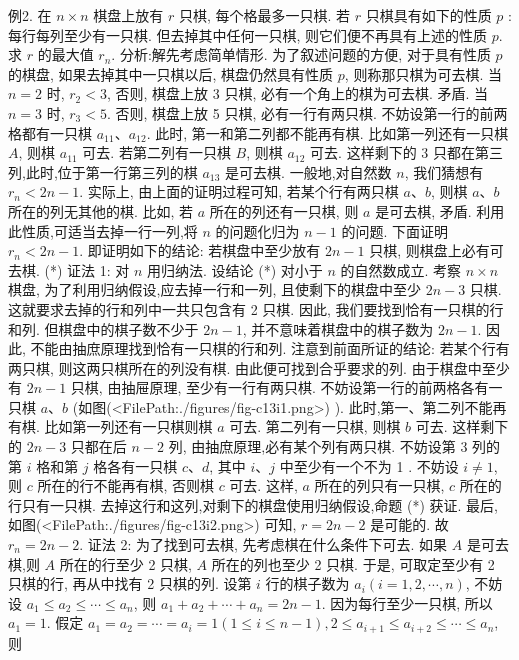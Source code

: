 例2. 在 $n \times n$ 棋盘上放有 $r$ 只棋, 每个格最多一只棋.
若 $r$ 只棋具有如下的性质 $p$ : 每行每列至少有一只棋.
但去掉其中任何一只棋, 则它们便不再具有上述的性质 $p$. 求 $r$ 的最大值 $r_n$.
分析:解先考虑简单情形.
为了叙述问题的方便, 对于具有性质 $p$ 的棋盘, 如果去掉其中一只棋以后, 棋盘仍然具有性质 $p$, 则称那只棋为可去棋.
当 $n=2$ 时, $r_2<3$, 否则, 棋盘上放 3 只棋, 必有一个角上的棋为可去棋.
矛盾.
当 $n=3$ 时, $r_3<5$. 否则, 棋盘上放 5 只棋, 必有一行有两只棋.
不妨设第一行的前两格都有一只棋 $a_{11} 、 a_{12}$. 此时, 第一和第二列都不能再有棋.
比如第一列还有一只棋 $A$, 则棋 $a_{11}$ 可去.
若第二列有一只棋 $B$, 则棋 $a_{12}$ 可去.
这样剩下的 3 只都在第三列,此时,位于第一行第三列的棋 $a_{13}$ 是可去棋.
一般地,对自然数 $n$, 我们猜想有 $r_n<2 n-1$.
实际上, 由上面的证明过程可知, 若某个行有两只棋 $a 、 b$, 则棋 $a 、 b$ 所在的列无其他的棋.
比如, 若 $a$ 所在的列还有一只棋, 则 $a$ 是可去棋, 矛盾.
利用此性质,可适当去掉一行一列,将 $n$ 的问题化归为 $n-1$ 的问题.
下面证明 $r_n<2 n-1$. 即证明如下的结论:
若棋盘中至少放有 $2 n-1$ 只棋, 则棋盘上必有可去棋. (*)
证法 1: 对 $n$ 用归纳法.
设结论 (*) 对小于 $n$ 的自然数成立.
考察 $n \times n$ 棋盘, 为了利用归纳假设,应去掉一行和一列, 且使剩下的棋盘中至少 $2 n-3$ 只棋.
这就要求去掉的行和列中一共只包含有 2 只棋.
因此, 我们要找到恰有一只棋的行和列.
但棋盘中的棋子数不少于 $2 n-1$, 并不意味着棋盘中的棋子数为 $2 n-1$. 因此, 不能由抽庶原理找到恰有一只棋的行和列.
注意到前面所证的结论: 若某个行有两只棋, 则这两只棋所在的列没有棋.
由此便可找到合乎要求的列.
由于棋盘中至少有 $2 n-1$ 只棋, 由抽屉原理, 至少有一行有两只棋.
不妨设第一行的前两格各有一只棋 $a 、 b$ (如图(<FilePath:./figures/fig-c13i1.png>) ). 此时,第一、第二列不能再有棋.
比如第一列还有一只棋则棋 $a$ 可去.
第二列有一只棋, 则棋 $b$ 可去.
这样剩下的 $2 n-3$ 只都在后 $n-2$ 列, 由抽庶原理,必有某个列有两只棋.
不妨设第 3 列的第 $i$ 格和第 $j$ 格各有一只棋 $c 、 d$, 其中 $i 、 j$ 中至少有一个不为 1 . 不妨设 $i \neq 1$, 则 $c$ 所在的行不能再有棋, 否则棋 $c$ 可去.
这样, $a$ 所在的列只有一只棋, $c$ 所在的行只有一只棋.
去掉这行和这列,对剩下的棋盘使用归纳假设,命题 (*) 获证.
最后, 如图(<FilePath:./figures/fig-c13i2.png>) 可知, $r=2 n-2$ 是可能的.
故 $r_n=2 n-2$.
证法 2: 为了找到可去棋, 先考虑棋在什么条件下可去.
如果 $A$ 是可去棋,则 $A$ 所在的行至少 2 只棋, $A$ 所在的列也至少 2 只棋.
于是, 可取定至少有 2 只棋的行, 再从中找有 2 只棋的列.
设第 $i$ 行的棋子数为 $a_i(i=1,2, \cdots, n)$, 不妨设 $a_1 \leqslant a_2 \leqslant \cdots \leqslant a_n$, 则 $a_1+a_2+\cdots+a_n=2 n-1$. 因为每行至少一只棋, 所以 $a_1=1$.
假定 $a_1=a_2=\cdots=a_i=1(1 \leqslant i \leqslant n-1), 2 \leqslant a_{i+1} \leqslant a_{i+2} \leqslant \cdots \leqslant a_n$, 则

